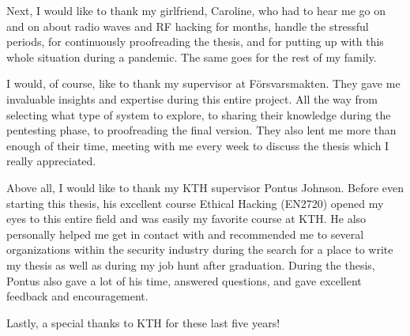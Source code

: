 Next, I would like to thank my girlfriend, Caroline, who had to hear me go on and on about radio waves and RF hacking for months, handle the stressful periods, for continuously proofreading the thesis, and for putting up with this whole situation during a pandemic. The same goes for the rest of my family.

I would, of course, like to thank my supervisor at Försvarsmakten. They gave me invaluable insights and expertise during this entire project. All the way from selecting what type of system to explore, to sharing their knowledge during the pentesting phase, to proofreading the final version. They also lent me more than enough of their time, meeting with me every week to discuss the thesis which I really appreciated.

Above all, I would like to thank my KTH supervisor Pontus Johnson. Before even starting this thesis, his excellent course Ethical Hacking (EN2720) opened my eyes to this entire field and was easily my favorite course at KTH. He also personally helped me get in contact with and recommended me to several organizations within the security industry during the search for a place to write my thesis as well as during my job hunt after graduation. During the thesis, Pontus also gave a lot of his time, answered questions, and gave excellent feedback and encouragement.

Lastly, a special thanks to KTH for these last five years!

\acknowlegmentssignature

\tableofcontents
\markboth{\contentsname}{}

\clearpage\listoffigures
\clearpage\listoftables
\clearpage\printglossary[type=\acronymtype, title={List of acronyms and abbreviations}]

